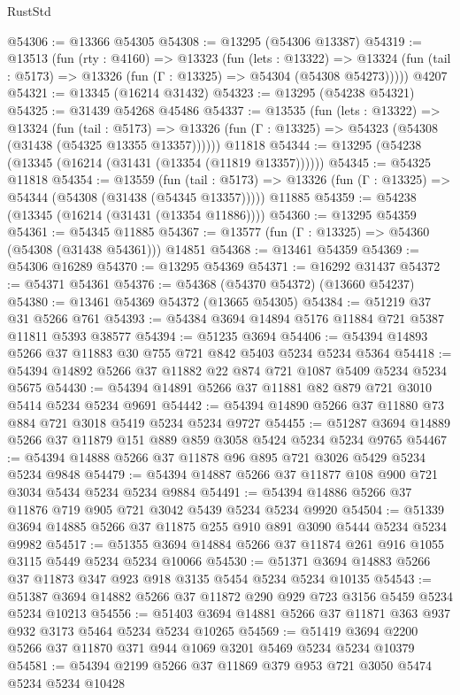 \begin{lexlean}{RustStd}
\begin{coremodule}
@54306 := @13366 @54305
@54308 := @13295 (@54306 @13387)
@54319 := @13513
    (fun (rty : @4160) =>
    @13323
      (fun (lets : @13322) =>
      @13324 (fun (tail : @5173) => @13326 (fun (Γ : @13325) => @54304 (@54308 @54273)))))
    @4207
@54321 := @13345 (@16214 @31432)
@54323 := @13295 (@54238 @54321)
@54325 := @31439 @54268 @45486
@54337 := @13535
    (fun (lets : @13322) =>
    @13324
      (fun (tail : @5173) =>
      @13326 (fun (Γ : @13325) => @54323 (@54308 (@31438 (@54325 @13355 @13357))))))
    @11818
@54344 := @13295 (@54238 (@13345 (@16214 (@31431 (@13354 (@11819 @13357))))))
@54345 := @54325 @11818
@54354 := @13559
    (fun (tail : @5173) => @13326 (fun (Γ : @13325) => @54344 (@54308 (@31438 (@54345 @13357)))))
    @11885
@54359 := @54238 (@13345 (@16214 (@31431 (@13354 @11886))))
@54360 := @13295 @54359
@54361 := @54345 @11885
@54367 := @13577 (fun (Γ : @13325) => @54360 (@54308 (@31438 @54361))) @14851
@54368 := @13461 @54359
@54369 := @54306 @16289
@54370 := @13295 @54369
@54371 := @16292 @31437
@54372 := @54371 @54361
@54376 := @54368 (@54370 @54372) (@13660 @54237)
@54380 := @13461 @54369 @54372 (@13665 @54305)
@54384 := @51219 @37 @31 @5266 @761
@54393 := @54384 @3694 @14894 @5176 @11884 @721 @5387 @11811 @5393 @38577
@54394 := @51235 @3694
@54406 := @54394 @14893 @5266 @37 @11883 @30 @755 @721 @842 @5403 @5234 @5234 @5364
@54418 := @54394 @14892 @5266 @37 @11882 @22 @874 @721 @1087 @5409 @5234 @5234 @5675
@54430 := @54394 @14891 @5266 @37 @11881 @82 @879 @721 @3010 @5414 @5234 @5234 @9691
@54442 := @54394 @14890 @5266 @37 @11880 @73 @884 @721 @3018 @5419 @5234 @5234 @9727
@54455 := @51287 @3694 @14889 @5266 @37 @11879 @151 @889 @859 @3058 @5424 @5234 @5234 @9765
@54467 := @54394 @14888 @5266 @37 @11878 @96 @895 @721 @3026 @5429 @5234 @5234 @9848
@54479 := @54394 @14887 @5266 @37 @11877 @108 @900 @721 @3034 @5434 @5234 @5234 @9884
@54491 := @54394 @14886 @5266 @37 @11876 @719 @905 @721 @3042 @5439 @5234 @5234 @9920
@54504 := @51339 @3694 @14885 @5266 @37 @11875 @255 @910 @891 @3090 @5444 @5234 @5234 @9982
@54517 := @51355 @3694 @14884 @5266 @37 @11874 @261 @916 @1055 @3115 @5449 @5234 @5234 @10066
@54530 := @51371 @3694 @14883 @5266 @37 @11873 @347 @923 @918 @3135 @5454 @5234 @5234 @10135
@54543 := @51387 @3694 @14882 @5266 @37 @11872 @290 @929 @723 @3156 @5459 @5234 @5234 @10213
@54556 := @51403 @3694 @14881 @5266 @37 @11871 @363 @937 @932 @3173 @5464 @5234 @5234 @10265
@54569 := @51419 @3694 @2200 @5266 @37 @11870 @371 @944 @1069 @3201 @5469 @5234 @5234 @10379
@54581 := @54394 @2199 @5266 @37 @11869 @379 @953 @721 @3050 @5474 @5234 @5234 @10428

\end{coremodule}
\end{lexlean}

